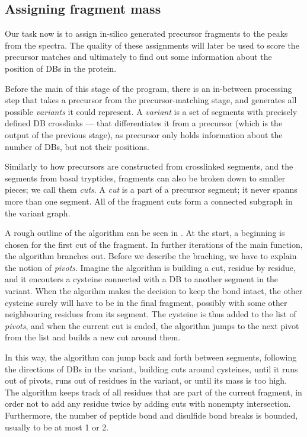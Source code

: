 \subsection{Assigning fragment mass}

Our task now is to assign in-silico generated precursor fragments to the peaks from the spectra. The quality of these assignments will later be used to score the precursor matches and ultimately to find out some information about the position of DBs in the protein.

Before the main of this stage of the program, there is an in-between processing step that takes a precursor from the precursor-matching stage, and generates all possible \emph{variants} it could represent. A \emph{variant} is a set of segments with precisely defined DB crosslinks --- that differentiates it from a precursor (which is the output of the previous stage), as precursor only holds information about the number of DBs, but not their positions.

Similarly to how precursors are constructed from crosslinked segments, and the segments from basal tryptides, fragments can also be broken down to smaller pieces; we call them \emph{cuts}. A \emph{cut} is a part of a precursor segment; it never spanns more than one segment. All of the fragment cuts form a connected subgraph in the variant graph.

A rough outline of the algorithm can be seen in . At the start, a beginning is chosen for the first cut of the fragment. In further iterations of the main function, the algorithm branches out. Before we describe the braching, we have to explain the notion of \emph{pivots}. Imagine the algorithm is building a cut, residue by residue, and it encouters a cysteine connected with a DB to another segment in the variant. When the algorihm makes the decision to keep the bond intact, the other cysteine surely will have to be in the final fragment, possibly with some other neighbouring residues from its segment. The cysteine is thus added to the list of \emph{pivots}, and when the current cut is ended, the algorithm jumps to the next pivot from the list and builds a new cut around them.

In this way, the algorithm can jump back and forth between segments, following the directions of DBs in the variant, building cuts around cysteines, until it runs out of pivots, runs out of residues in the variant, or until its mass is too high. The algorithm keeps track of all residues that are part of the current fragment, in order not to add any residue twice by adding cuts with nonempty intersection. Furthermore, the number of peptide bond and disulfide bond breaks is bounded, usually to be at most 1 or 2.

